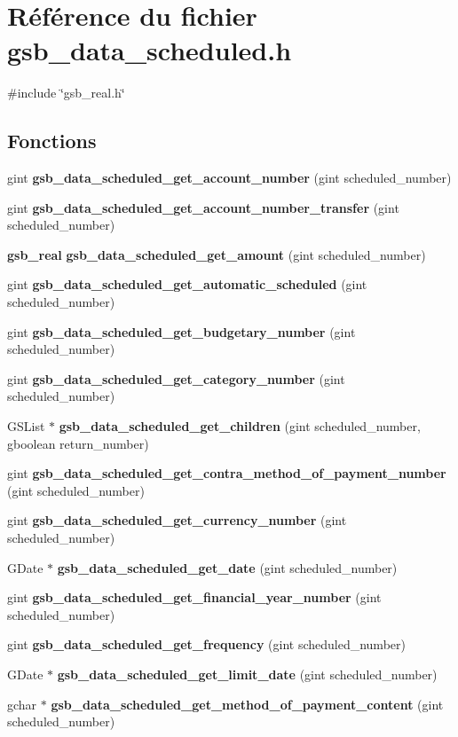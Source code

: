 \section{Référence du fichier gsb\_\-data\_\-scheduled.h}
\label{gsb__data__scheduled_8h}
{\ttfamily \#include \char`\"{}gsb\_\-real.h\char`\"{}}\par
\subsection*{Fonctions}
\begin{DoxyCompactItemize}
\item 
gint {\bf gsb\_\-data\_\-scheduled\_\-get\_\-account\_\-number} (gint scheduled\_\-number)
\item 
gint {\bf gsb\_\-data\_\-scheduled\_\-get\_\-account\_\-number\_\-transfer} (gint scheduled\_\-number)
\item 
{\bf gsb\_\-real} {\bf gsb\_\-data\_\-scheduled\_\-get\_\-amount} (gint scheduled\_\-number)
\item 
gint {\bf gsb\_\-data\_\-scheduled\_\-get\_\-automatic\_\-scheduled} (gint scheduled\_\-number)
\item 
gint {\bf gsb\_\-data\_\-scheduled\_\-get\_\-budgetary\_\-number} (gint scheduled\_\-number)
\item 
gint {\bf gsb\_\-data\_\-scheduled\_\-get\_\-category\_\-number} (gint scheduled\_\-number)
\item 
GSList $\ast$ {\bf gsb\_\-data\_\-scheduled\_\-get\_\-children} (gint scheduled\_\-number, gboolean return\_\-number)
\item 
gint {\bf gsb\_\-data\_\-scheduled\_\-get\_\-contra\_\-method\_\-of\_\-payment\_\-number} (gint scheduled\_\-number)
\item 
gint {\bf gsb\_\-data\_\-scheduled\_\-get\_\-currency\_\-number} (gint scheduled\_\-number)
\item 
GDate $\ast$ {\bf gsb\_\-data\_\-scheduled\_\-get\_\-date} (gint scheduled\_\-number)
\item 
gint {\bf gsb\_\-data\_\-scheduled\_\-get\_\-financial\_\-year\_\-number} (gint scheduled\_\-number)
\item 
gint {\bf gsb\_\-data\_\-scheduled\_\-get\_\-frequency} (gint scheduled\_\-number)
\item 
GDate $\ast$ {\bf gsb\_\-data\_\-scheduled\_\-get\_\-limit\_\-date} (gint scheduled\_\-number)
\item 
gchar $\ast$ {\bf gsb\_\-data\_\-scheduled\_\-get\_\-method\_\-of\_\-payment\_\-content} (gint scheduled\_\-number)

\end{DoxyCompactItemize}
